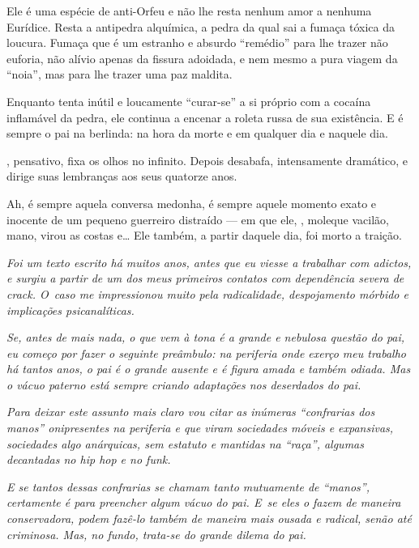 Ele é uma espécie de anti-Orfeu e não lhe resta nenhum amor a nenhuma
Eurídice. Resta a antipedra alquímica, a pedra da qual sai a fumaça
tóxica da loucura. Fumaça que é um estranho e absurdo ``remédio'' para
lhe trazer não euforia, não alívio apenas da fissura adoidada, e nem
mesmo a pura viagem da ``noia'', mas para lhe trazer uma paz maldita.

Enquanto  tenta inútil e loucamente ``curar-se'' a si próprio com a
cocaína inflamável da pedra, ele continua a encenar a roleta russa de
sua existência. E é sempre o pai na berlinda: na hora da morte e em
qualquer dia e naquele dia.

, pensativo, fixa os olhos no infinito. Depois desabafa, intensamente
dramático, e dirige suas lembranças aos seus quatorze anos.

Ah, é sempre aquela conversa medonha, é sempre aquele momento exato e
inocente de um pequeno guerreiro distraído --- em que ele, , moleque
vacilão, mano, virou as costas e… Ele também, a partir daquele
dia, foi morto a traição.

\begin{center}\asterisc{}\end{center}
\begingroup\small

\emph{Foi um texto escrito há muitos anos, antes que eu viesse a
trabalhar com adictos, e surgiu a partir de um dos meus primeiros
contatos com dependência severa de crack. O~caso me impressionou muito
pela radicalidade, despojamento mórbido e implicações psicanalíticas.}

\emph{Se, antes de mais nada, o que vem à tona é a grande e nebulosa
questão do pai, eu começo por fazer o seguinte preâmbulo: na periferia
onde exerço meu trabalho há tantos anos, o pai é o grande ausente e é
figura amada e também odiada. Mas o vácuo paterno está sempre criando
adaptações nos deserdados do pai.}

\emph{Para deixar este assunto mais claro vou citar as inúmeras
``confrarias dos manos'' onipresentes na periferia e que viram
sociedades móveis e expansivas, sociedades algo anárquicas, sem estatuto
e mantidas na ``raça'', algumas decantadas no hip hop e no funk.}

\emph{E se tantos dessas confrarias se chamam tanto mutuamente de
``manos'', certamente é para preencher algum vácuo do pai. E~se eles o
fazem de maneira conservadora, podem fazê-lo também de maneira mais
ousada e radical, senão até criminosa. Mas, no fundo, trata-se do grande
dilema do pai.}

